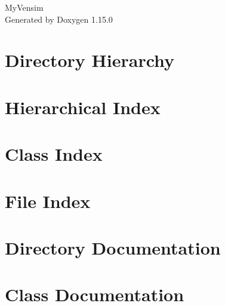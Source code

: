 \documentclass[twoside]{book}
\newcommand{\+}{\discretionary{\mbox{\scriptsize$\hookleftarrow$}}{}{}}
\newcommand{\clearemptydoublepage}{%
    \newpage{\pagestyle{empty}\cleardoublepage}%
  }
\begin{document}
  \raggedbottom
    \hypersetup{pageanchor=false,
                bookmarksnumbered=true,
                pdfencoding=unicode
               }
  \begin{titlepage}
  \vspace*{7cm}
  \begin{center}%
  {\Large My\+Vensim}\\
  \vspace*{1cm}
  {\large Generated by Doxygen 1.15.0}\\
  \end{center}
  \end{titlepage}
  \clearemptydoublepage
  \tableofcontents
  \clearemptydoublepage
  \hypersetup{pageanchor=true}

\chapter{Directory Hierarchy}

\chapter{Hierarchical Index}

\chapter{Class Index}

\chapter{File Index}

\chapter{Directory Documentation}





\chapter{Class Documentation}






















\end{document}
